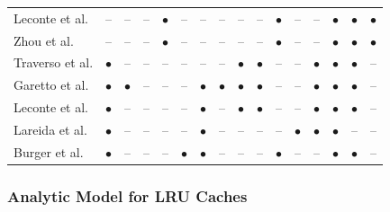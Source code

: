 \begin{table}
\begin{tabular}{|l|ccccc|cc|cc|cc|cccc|}
    Leconte et al. \cite{leconte2014adaptive} & -- & -- & -- & $\bullet$ & -- & -- & -- & -- & -- & $\bullet$ & -- & -- & $\bullet$ & $\bullet$ & $\bullet$ \\
    Zhou et al. \cite{zhou2015unifying} & -- & -- & -- & $\bullet$ & -- & -- & -- & -- & -- & $\bullet$ & -- & -- & $\bullet$ & $\bullet$ & $\bullet$ \\
    Traverso et al. \cite{traverso2013temporal} & $\bullet$ & -- & -- & -- & -- & -- & -- & $\bullet$ & $\bullet$ & -- & -- & $\bullet$ & $\bullet$ & $\bullet$ & -- \\
    Garetto et al. \cite{garetto2014dynamic} & $\bullet$ & $\bullet$ & -- & -- & -- & $\bullet$ & $\bullet$ & $\bullet$ & $\bullet$ & -- & -- & $\bullet$ & $\bullet$ & $\bullet$ & -- \\
    Leconte et al. \cite{leconte2016dynamic} & $\bullet$ & -- & -- & -- & -- & $\bullet$ & -- & $\bullet$ & $\bullet$ & -- & -- & $\bullet$ & $\bullet$ & $\bullet$ & -- \\ \hline
    Lareida et al. \cite{lareida2015augmenting} & $\bullet$ & -- & -- & -- & -- & $\bullet$ & -- & -- & -- & -- & $\bullet$ & $\bullet$ & $\bullet$ & -- & -- \\
    Burger et al. \cite{burger2016hierarchical} & $\bullet$ & -- & -- & -- & $\bullet$ & $\bullet$ & -- & -- & -- & $\bullet$ & -- & -- & $\bullet$ & $\bullet$ & -- \\
		\hline
	\end{tabular}%
\end{table}

\subsubsection{Analytic Model for LRU Caches}


